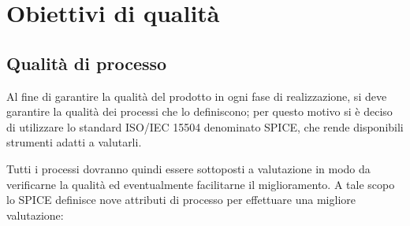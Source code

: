 \section{Obiettivi di qualità} 
\subsection{Qualità di processo}

Al fine di garantire la qualità del prodotto in ogni fase di realizzazione, si deve garantire la qualità dei processi che lo definiscono; per questo motivo si è deciso di utilizzare lo standard ISO/IEC 15504 denominato SPICE, che rende disponibili strumenti adatti a valutarli.


Tutti i processi dovranno quindi essere sottoposti a valutazione in modo da verificarne la qualità ed eventualmente facilitarne il miglioramento. A tale scopo lo SPICE definisce nove attributi di processo per effettuare una migliore valutazione:
